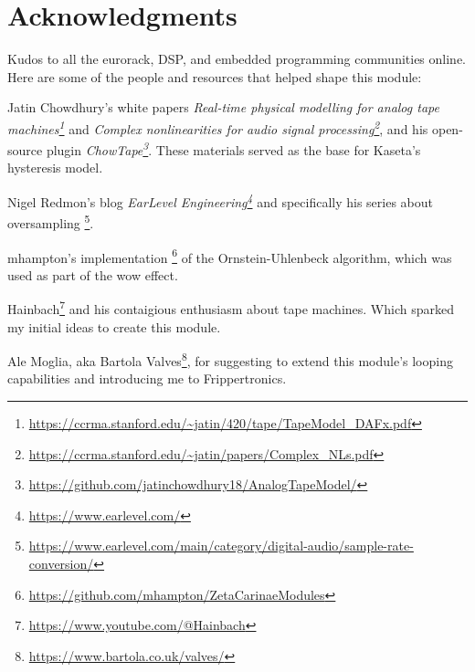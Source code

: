 \documentclass[11pt]{article}
\begin{document}
\newpage

\noindent
\begin{minipage}[t]{0.3\textwidth}
\setlength{\parskip}{6pt}
\section{Acknowledgments}

Kudos to all the eurorack, DSP, and embedded programming communities online.
Here are some of the people and resources that helped shape this module:

Jatin Chowdhury's white papers
\textit{Real-time physical modelling for analog tape machines\footnote{
  \url{https://ccrma.stanford.edu/~jatin/420/tape/TapeModel_DAFx.pdf}
}}
and
\textit{Complex nonlinearities for audio signal processing\footnote{
  \url{https://ccrma.stanford.edu/~jatin/papers/Complex_NLs.pdf}
}},
and his open-source plugin
\textit{ChowTape\footnote{
  \url{https://github.com/jatinchowdhury18/AnalogTapeModel/}
}}. These materials served as the base for Kaseta's hysteresis model.

Nigel Redmon's blog
\textit{EarLevel Engineering\footnote{
  \url{https://www.earlevel.com/}
}}
and specifically his series about oversampling%
\footnote{\url{https://www.earlevel.com/main/category/digital-audio/sample-rate-conversion/}}.

mhampton's implementation%
\footnote{\url{https://github.com/mhampton/ZetaCarinaeModules}}
of the Ornstein-Uhlenbeck algorithm, which was used as part of the wow effect.

Hainbach\footnote{\url{https://www.youtube.com/@Hainbach}}
and his contaigious enthusiasm about tape machines. Which sparked my initial
ideas to create this module.

Ale Moglia, aka Bartola Valves\footnote{\url{https://www.bartola.co.uk/valves/}},
for suggesting to extend this module's looping capabilities and introducing me
to Frippertronics.

\vspace{0.5cm}

\end{minipage}%
\begin{minipage}{0.05\textwidth}
\phantom{ }
\end{minipage}%
\end{document}
